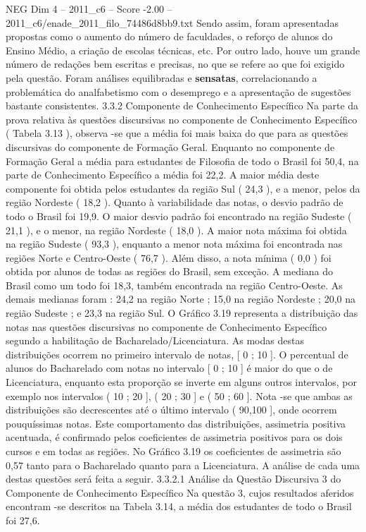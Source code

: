 \begin{textsample}{NEG Dim 4 – 2011\_c6 – Score -2.00 – 2011\_c6/enade\_2011\_filo\_74486d8bb9.txt}
Sendo assim, foram apresentadas propostas como o aumento do número de faculdades, o reforço de alunos do Ensino Médio, a criação de escolas técnicas, etc.
Por outro lado, houve um grande número de redações bem escritas e precisas, no que se refere ao que foi exigido pela questão.
Foram análises equilibradas e \textbf{sensatas}, correlacionando a problemática do analfabetismo com o desemprego e a apresentação de sugestões bastante consistentes. 3.3.2 Componente de Conhecimento Específico Na parte da prova relativa às questões discursivas no componente de Conhecimento Específico ( Tabela 3.13 ), observa -se que a média foi mais baixa do que para as questões discursivas do componente de Formação Geral.
Enquanto no componente de Formação Geral a média para estudantes de Filosofia de todo o Brasil foi 50,4, na parte de Conhecimento Específico a média foi 22,2.
A maior média deste componente foi obtida pelos estudantes da região Sul ( 24,3 ), e a menor, pelos da região Nordeste ( 18,2 ).
Quanto à variabilidade das notas, o desvio padrão de todo o Brasil foi 19,9.
O maior desvio padrão foi encontrado na região Sudeste ( 21,1 ), e o menor, na região Nordeste ( 18,0 ).
A maior nota máxima foi obtida na região Sudeste ( 93,3 ), enquanto a menor nota máxima foi encontrada nas regiões Norte e Centro-Oeste ( 76,7 ).
Além disso, a nota mínima ( 0,0 ) foi obtida por alunos de todas as regiões do Brasil, sem exceção.
A mediana do Brasil como um todo foi 18,3, também encontrada na região Centro-Oeste.
As demais medianas foram : 24,2 na região Norte ; 15,0 na região Nordeste ; 20,0 na região Sudeste ; e 23,3 na região Sul.
O Gráfico 3.19 representa a distribuição das notas nas questões discursivas no componente de Conhecimento Específico segundo a habilitação de Bacharelado/Licenciatura.
As modas destas distribuições ocorrem no primeiro intervalo de notas, [ 0 ; 10 ].
O percentual de alunos do Bacharelado com notas no intervalo [ 0 ; 10 ] é maior do que o de Licenciatura, enquanto esta proporção se inverte em alguns outros intervalos, por exemplo nos intervalos ( 10 ; 20 ], ( 20 ; 30 ] e ( 50 ; 60 ].
Nota -se que ambas as distribuições são decrescentes até o último intervalo ( 90,100 ], onde ocorrem pouquíssimas notas.
Este comportamento das distribuições, assimetria positiva acentuada, é confirmado pelos coeficientes de assimetria positivos para os dois cursos e em todas as regiões.
No Gráfico 3.19 os coeficientes de assimetria são 0,57 tanto para o Bacharelado quanto para a Licenciatura.
A análise de cada uma destas questões será feita a seguir. 3.3.2.1 Análise da Questão Discursiva 3 do Componente de Conhecimento Específico Na questão 3, cujos resultados aferidos encontram -se descritos na Tabela 3.14, a média dos estudantes de todo o Brasil foi 27,6.

\end{textsample}
